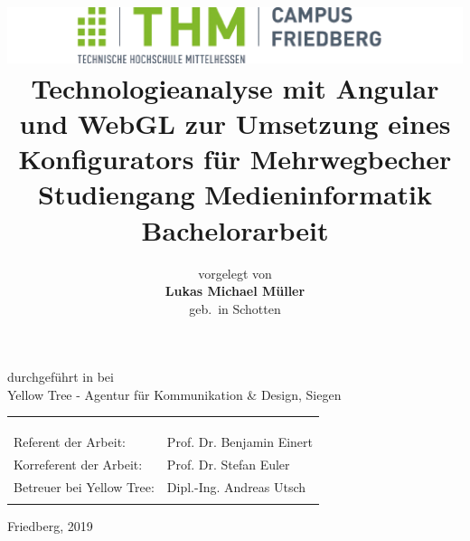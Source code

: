\documentclass[11pt,a4paper,twoside,openright]{memoir}
\author{ 
	\small{vorgelegt von} \vspace{.5cm} 											\\ 
	\Large{\textbf{Lukas Michael Müller}} 											\\ 
	\small{geb.\ in Schotten}}
\title{
	\textbf{\vspace{-2.5cm}
		\includegraphics[width=16.0cm]{thm.png} \\
		\vspace{3cm} Technologieanalyse mit Angular und WebGL zur Umsetzung eines Konfigurators für Mehrwegbecher} \\
	\vspace{1cm}
	\normalsize{Studiengang Medieninformatik} \vspace{1cm} \\
	\Large{\textbf{Bachelorarbeit}} }
\date{}
\begin{document}
	\frontmatter
	
		\begin{titlingpage}
			\begin{center}
				\maketitle
				\vspace{-1cm}
				\small{durchgeführt in bei} \\
				\small{Yellow Tree - Agentur für Kommunikation \& Design, Siegen}
				\begin{tabular}{ll}
					& \\
					& \\
					& \\
					Referent der Arbeit: & Prof. Dr. Benjamin Einert \\
					Korreferent der Arbeit: & Prof. Dr. Stefan Euler \\
					Betreuer bei Yellow Tree: & Dipl.-Ing. Andreas Utsch \\
					& \\
				\end{tabular}
				
				\vspace{\fill}
				\small{Friedberg, 2019}
			\end{center}
			
		\end{titlingpage}
	
	\thispagestyle{empty}
	\begin{flushright}
		\vspace*{\fill}
		\Large{\textsl{}}
		\vspace{15cm}
	\end{flushright}

	\cleardoublepage
	\setcounter{page}{1}
	
	

	
	
	\cleardoublepage
	
	\tableofcontents
	
	\cleardoublepage
	
	\listoffigures
	
	\mainmatter

		
\end{document}
